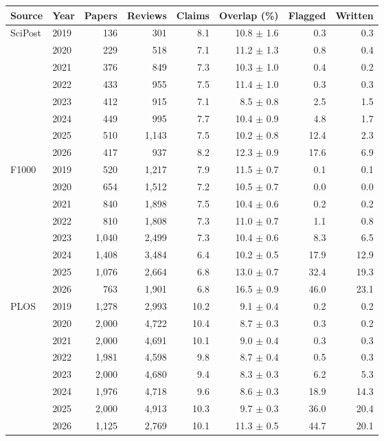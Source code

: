 \begin{tabular}{llrrrrrr}
\toprule
Source & Year & Papers & Reviews & Claims & Overlap (\%) & Flagged & Written \\
\midrule
SciPost & 2019 & 136 & 301 & 8.1 & 10.8 $\pm$ 1.6 & 0.3 & 0.3 \\
 & 2020 & 229 & 518 & 7.1 & 11.2 $\pm$ 1.3 & 0.8 & 0.4 \\
 & 2021 & 376 & 849 & 7.3 & 10.3 $\pm$ 1.0 & 0.4 & 0.2 \\
 & 2022 & 433 & 955 & 7.5 & 11.4 $\pm$ 1.0 & 0.3 & 0.3 \\
 & 2023 & 412 & 915 & 7.1 & 8.5 $\pm$ 0.8 & 2.5 & 1.5 \\
 & 2024 & 449 & 995 & 7.7 & 10.4 $\pm$ 0.9 & 4.8 & 1.7 \\
 & 2025 & 510 & 1,143 & 7.5 & 10.2 $\pm$ 0.8 & 12.4 & 2.3 \\
 & 2026 & 417 & 937 & 8.2 & 12.3 $\pm$ 0.9 & 17.6 & 6.9 \\
\midrule
F1000 & 2019 & 520 & 1,217 & 7.9 & 11.5 $\pm$ 0.7 & 0.1 & 0.1 \\
 & 2020 & 654 & 1,512 & 7.2 & 10.5 $\pm$ 0.7 & 0.0 & 0.0 \\
 & 2021 & 840 & 1,898 & 7.5 & 10.4 $\pm$ 0.6 & 0.2 & 0.2 \\
 & 2022 & 810 & 1,808 & 7.3 & 11.0 $\pm$ 0.7 & 1.1 & 0.8 \\
 & 2023 & 1,040 & 2,499 & 7.3 & 10.4 $\pm$ 0.6 & 8.3 & 6.5 \\
 & 2024 & 1,408 & 3,484 & 6.4 & 10.2 $\pm$ 0.5 & 17.9 & 12.9 \\
 & 2025 & 1,076 & 2,664 & 6.8 & 13.0 $\pm$ 0.7 & 32.4 & 19.3 \\
 & 2026 & 763 & 1,901 & 6.8 & 16.5 $\pm$ 0.9 & 46.0 & 23.1 \\
\midrule
PLOS & 2019 & 1,278 & 2,993 & 10.2 & 9.1 $\pm$ 0.4 & 0.2 & 0.2 \\
 & 2020 & 2,000 & 4,722 & 10.4 & 8.7 $\pm$ 0.3 & 0.3 & 0.2 \\
 & 2021 & 2,000 & 4,691 & 10.1 & 9.0 $\pm$ 0.4 & 0.3 & 0.3 \\
 & 2022 & 1,981 & 4,598 & 9.8 & 8.7 $\pm$ 0.4 & 0.5 & 0.3 \\
 & 2023 & 2,000 & 4,680 & 9.4 & 8.3 $\pm$ 0.3 & 6.2 & 5.3 \\
 & 2024 & 1,976 & 4,718 & 9.6 & 8.6 $\pm$ 0.3 & 18.9 & 14.3 \\
 & 2025 & 2,000 & 4,913 & 10.3 & 9.7 $\pm$ 0.3 & 36.0 & 20.4 \\
 & 2026 & 1,125 & 2,769 & 10.1 & 11.3 $\pm$ 0.5 & 44.7 & 20.1 \\

\end{tabular}
